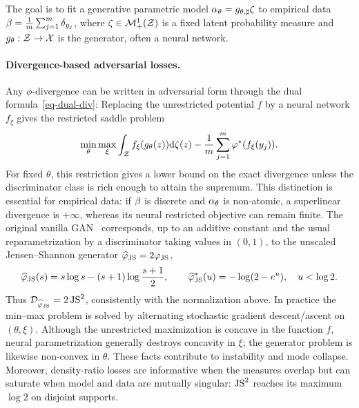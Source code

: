 The goal is to fit a generative parametric model $\alpha_\theta = g_{\theta,\sharp} \zeta$ to empirical data $\beta = \frac{1}{m}\sum_{j=1}^m \delta_{y_j}$, where $\zeta \in \mathcal{M}_+^1(\mathcal{Z})$ is a fixed latent probability measure and $g_\theta : \mathcal{Z} \rightarrow \mathcal{X}$ is the generator, often a neural network.

\paragraph{Divergence-based adversarial losses.}

Any $\phi$-divergence can be written in adversarial form through the dual formula~\eqref{eq-dual-div}:
Replacing the unrestricted potential $f$ by a neural network $f_\xi$ gives the restricted saddle problem
\[
	\min_\theta\max_\xi
	\int_{\mathcal{Z}} f_\xi(g_\theta(z))\mathrm{d}\zeta(z)
	-
	\frac1m\sum_{j=1}^m \varphi^*(f_\xi(y_j)).
\]
For fixed $\theta$, this restriction gives a lower bound on the exact divergence unless the discriminator class is rich enough to attain the supremum. This distinction is essential for empirical data: if $\beta$ is discrete and $\alpha_\theta$ is non-atomic, a superlinear divergence is $+\infty$, whereas its neural restricted objective can remain finite. The original vanilla GAN~\cite{GAN} corresponds, up to an additive constant and the usual reparametrization by a discriminator taking values in $(0,1)$, to the unscaled Jensen--Shannon generator $\widehat{\varphi}_{\operatorname{JS}}=2\varphi_{\operatorname{JS}}$,
\[
	\widehat{\varphi}_{\operatorname{JS}}(s)=s\log s-(s+1)\log\frac{s+1}{2},
	\qquad
	\widehat{\varphi}_{\operatorname{JS}}^*(u)=-\log(2-e^u),\quad u<\log2.
\]
Thus $\mathcal{D}_{\widehat{\varphi}_{\operatorname{JS}}}=2\operatorname{JS}^2$, consistently with the normalization above. In practice the min--max problem is solved by alternating stochastic gradient descent/ascent on $(\theta,\xi)$. Although the unrestricted maximization is concave in the function $f$, neural parametrization generally destroys concavity in $\xi$; the generator problem is likewise non-convex in $\theta$. These facts contribute to instability and mode collapse. Moreover, density-ratio losses are informative when the measures overlap but can saturate when model and data are mutually singular: $\operatorname{JS}^2$ reaches its maximum $\log2$ on disjoint supports.

